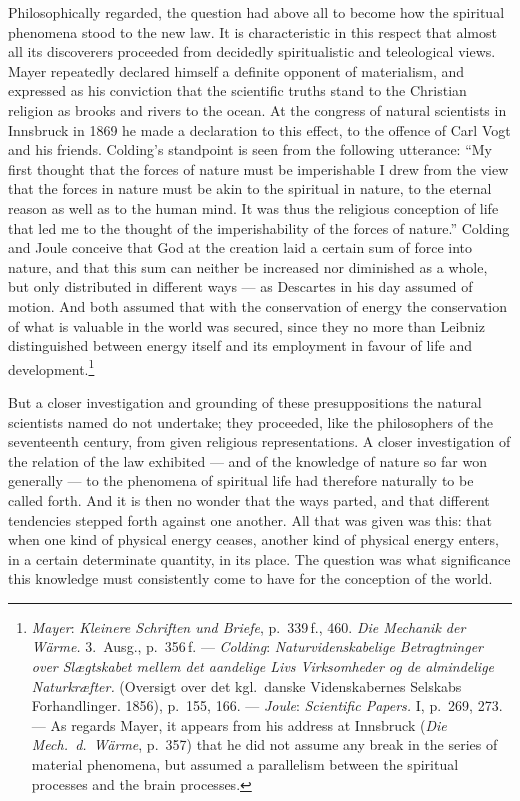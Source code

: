 \documentclass[12pt,a4paper]{book}
\newcommand{\opage}[1]{\marginnote{\footnotesize\textit{[#1]}}}
\begin{document}
Philosophically regarded, the question had above all to become how the spiritual
phenomena stood to the new law. It is characteristic in this respect that almost
all its discoverers proceeded from decidedly spiritualistic and teleological
views. Mayer repeatedly declared himself a definite opponent of materialism, and
expressed as his conviction that the scientific truths stand to the Christian
religion as brooks and rivers to the ocean. At the congress of natural
scientists in Innsbruck in 1869 he made a declaration to this effect, to the
offence of Carl Vogt and his friends. Colding's standpoint is seen from the
following utterance: ``My first thought that the forces of nature must be
imperishable I drew from the view that the forces in nature must be akin to the
spiritual in nature, to the eternal reason as well as to the human mind. It was
thus the religious conception of life that led me to the thought of the
imperishability of the forces of nature.'' Colding and Joule conceive that God
at the creation laid a certain sum of force into nature, and that this sum can
neither be increased nor diminished as a whole, but only distributed in
different ways --- as \opage{500}Descartes in his day assumed of motion. And both assumed
that with the conservation of energy the conservation of what is valuable in the
world was secured, since they no more than Leibniz distinguished between energy
itself and its employment in favour of life and development.\footnote{\emph{Mayer}: \textit{Kleinere Schriften und Briefe}, p.~339\,f., 460. \textit{Die Mechanik
der Wärme.} 3.~Ausg., p.~356\,f. --- \emph{Colding}: \textit{Naturvidenskabelige
Betragtninger over Slægtskabet mellem det aandelige Livs Virksomheder og de
almindelige Naturkræfter.} (Oversigt over det kgl.\ danske Videnskabernes
Selskabs Forhandlinger. 1856), p.~155, 166. --- \emph{Joule}: \textit{Scientific
Papers.} I, p.~269, 273. --- As regards Mayer, it appears from his address at
Innsbruck (\textit{Die Mech.\ d.\ Wärme}, p.~357) that he did not \opage{598}assume any
break in the series of material phenomena, but assumed a parallelism between the
spiritual processes and the brain processes.}

But a closer investigation and grounding of these presuppositions the natural
scientists named do not undertake; they proceeded, like the philosophers of the
seventeenth century, from given religious representations. A closer
investigation of the relation of the law exhibited --- and of the knowledge of
nature so far won generally --- to the phenomena of spiritual life had therefore
naturally to be called forth. And it is then no wonder that the ways parted, and
that different tendencies stepped forth against one another. All that was given
was this: that when one kind of physical energy ceases, another kind of physical
energy enters, in a certain determinate quantity, in its place. The question was
what significance this knowledge must consistently come to have for the
conception of the world.
\end{document}
